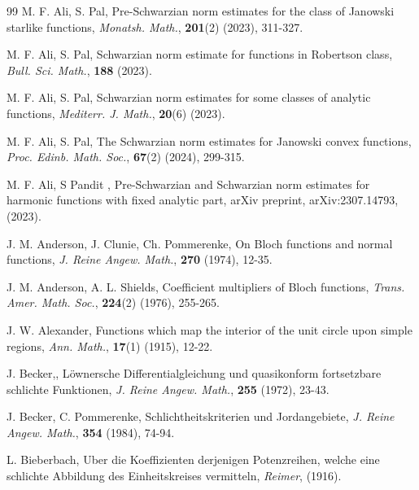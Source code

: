 \documentclass[a4paper,12pt]{amsart}
\theoremstyle{definition}
\begin{document}
	
	\vspace{10mm}
	\begin{thebibliography}{99}
		{\sc M. F. Ali, S. Pal}, Pre-Schwarzian norm estimates for the class of Janowski starlike functions, {\it Monatsh. Math.}, {\bf 201}(2) (2023), 311-327.
		
		{\sc M. F. Ali, S. Pal}, Schwarzian norm estimate for functions in Robertson class, {\it Bull. Sci. Math.}, {\bf 188} (2023).
		
		
		{\sc M. F. Ali, S. Pal}, Schwarzian norm estimates for some classes of analytic functions, {\it Mediterr. J. Math.}, {\bf 20}(6) (2023).
		
		{\sc M. F. Ali, S. Pal}, The Schwarzian norm estimates for Janowski convex functions, {\it Proc. Edinb. Math. Soc.}, {\bf 67}(2) (2024), 299-315.
		
		{\sc M. F. Ali, S Pandit }, Pre-Schwarzian and Schwarzian norm estimates for harmonic functions with fixed analytic part, arXiv preprint, arXiv:2307.14793, (2023).
		
		
		{\sc J. M. Anderson, J. Clunie, Ch. Pommerenke}, On {B}loch functions and normal functions, {\it J. Reine Angew. Math.}, {\bf 270} (1974), 12-35.
		
		
		{\sc J. M. Anderson, A. L. Shields}, Coefficient multipliers of {B}loch functions, {\it Trans. Amer. Math. Soc.}, {\bf 224}(2) (1976), 255-265.
		
		
		
		
		
		{\sc J. W. Alexander}, Functions which map the interior of the unit circle upon simple regions, {\it Ann. Math.}, {\bf 17}(1) (1915), 12-22.
		
		{\sc J. Becker,}, L{\"o}wnersche Differentialgleichung und quasikonform fortsetzbare schlichte Funktionen, {\it J. Reine Angew. Math.}, {\bf 255} (1972), 23-43.
		
		{\sc J. Becker, C. Pommerenke}, Schlichtheitskriterien und Jordangebiete, {\it J. Reine Angew. Math.}, {\bf 354} (1984), 74-94.
		
		{\sc L. Bieberbach}, Uber die Koeffizienten derjenigen Potenzreihen, welche eine schlichte Abbildung des Einheitskreises vermitteln, {\it Reimer}, (1916).
		

\end{thebibliography}
\end{document}
